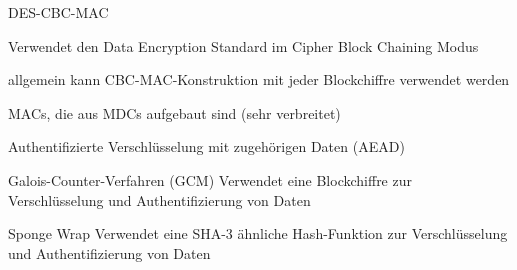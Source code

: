 \documentclass[a4paper]{article}
\begin{document}
\begin{multicols}{3}
\begin{itemize*}
            \begin{itemize*}
                  \item DES-CBC-MAC
                  \begin{itemize*}
                        \item Verwendet den Data Encryption Standard im Cipher Block Chaining Modus
                        \item allgemein kann CBC-MAC-Konstruktion mit jeder Blockchiffre verwendet werden
                  \end{itemize*}
                  \item MACs, die aus MDCs aufgebaut sind (sehr verbreitet)
            \end{itemize*}
            \item Authentifizierte Verschlüsselung mit zugehörigen Daten (AEAD)
            \begin{description*}
                  \item[Galois-Counter-Verfahren] (GCM) Verwendet eine Blockchiffre zur Verschlüsselung und Authentifizierung von Daten
                  \item[Sponge Wrap] Verwendet eine SHA-3 ähnliche Hash-Funktion zur Verschlüsselung und Authentifizierung von Daten
            \end{description*}
      \end{itemize*}


\end{multicols}
\end{document}
